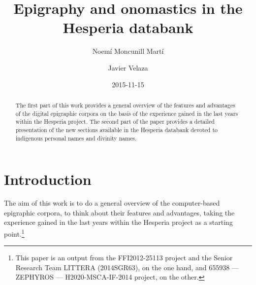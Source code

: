 \documentclass[amsthm,ebook]{saparticle}
\title{Epigraphy and onomastics in the Hesperia databank}
\author[barc]{Noemí Moncunill Martí \corref{first}}
\author[sorb]{Javier Velaza}
\date{2015-11-15}
\begin{document}
\maketitle
\begin{abstract}
The first part of this work provides a general overview of the features and advantages of the digital epigraphic corpora
on the basis of the experience gained in the last years within the Hesperia project. The second part of the paper
provides a detailed presentation of the new sections available in the Hesperia databank devoted to indigenous personal
names and divinity names.
\end{abstract}


\section{Introduction}


The aim of this work is to do a general overview of the computer-based epigraphic corpora, to think about their features
and advantages, taking the experience gained in the last years within the Hesperia project as a starting point.\footnote{ This paper is an output from the FFI2012-25113 project and the Senior Research Team LITTERA
(2014SGR63), on the one hand, and 655938 — ZEPHYROS — H2020-MSCA-IF-2014 project, on the other.}
\end{document}
